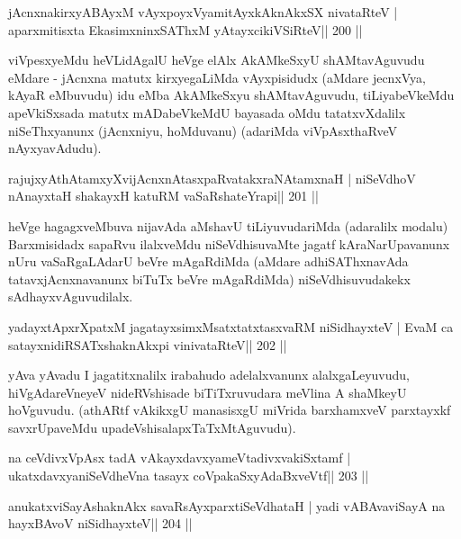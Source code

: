 \begin{shl}
jAcnxnakirxyABAyxM vAyxpoyxV\s yamitAyxkAknAkxSX nivataRteV |
aparxmitisxta EkasimxninxSAThxM yAtayxcikiVSiRteV\hfill || 200 ||
\end{shl}

\begin{artha}
viVpesxyeMdu heVLidAgalU heVge elAlx AkAMkeSxyU shAMtavAguvudu eMdare - jAcnxna matutx kirxyegaLiMda vAyxpisidudx (aMdare jecnxVya, kAyaR eMbuvudu) idu eMba AkAMkeSxyu shAMtavAguvudu, tiLiyabeVkeMdu apeVkiSxsada matutx mADabeVkeMdU bayasada oMdu tatatxvXdalilx niSeThxyanunx (jAcnxniyu, hoMduvanu) (adariMda viVpAsxthaRveV nAyxyavAdudu).
\end{artha}


\begin{shl}
rajujxyAthAtamxyXvijAcnxnAtasxpaRvatakxraNAtamxnaH |
niSeVdhoV nAnayxtaH shakayxH katuRM vaSaRshateYrapi\hfill || 201  ||
\end{shl}

\begin{artha}
heVge hagagxveMbuva nijavAda aMshavU tiLiyuvudariMda (adaralilx modalu) Barxmisidadx sapaRvu ilalxveMdu niSeVdhisuvaMte jagatf kAraNarUpavanunx nUru vaSaRgaLAdarU beVre mAgaRdiMda (aMdare adhiSAThxnavAda tatavxjAcnxnavanunx biTuTx beVre mAgaRdiMda) niSeVdhisuvudakekx sAdhayxvAguvudilalx.
\end{artha}

\begin{shl}
yadayxtApxrXpatxM jagatayxsimxMsatxtatxtasxvaRM niSidhayxteV |
EvaM ca satayxnidiRSATxshaknAkx\s pi vinivataRteV\hfill || 202 ||
\end{shl}

\begin{artha}
yAva yAvadu I jagatitxnalilx irabahudo adelalxvanunx alalxgaLeyuvudu, hiVgAdareVneyeV nideRVshisade biTiTxruvudara meVlina A shaMkeyU hoVguvudu. (athARtf vAkikxgU manasisxgU miVrida barxhamxveV parxtayxkf savxrUpaveMdu upadeVshisalapxTaTxMtAguvudu).
\end{artha}

\begin{shl}
na ceVdivxVpAsx tadA vAkayxdavxyameVtadivxvakiSxtamf |
ukatxdavxyaniSeVdheVna tasayx coVpakaSxyAdaBxveVtf\hfill || 203 ||
\end{shl}

\begin{shl}
anukatxviSayAshaknAkx savaRsAyxparxtiSeVdhataH |
yadi vA\s BAvaviSayA na hayxBAvoV niSidhayxteV\hfill || 204 ||
\end{shl}

